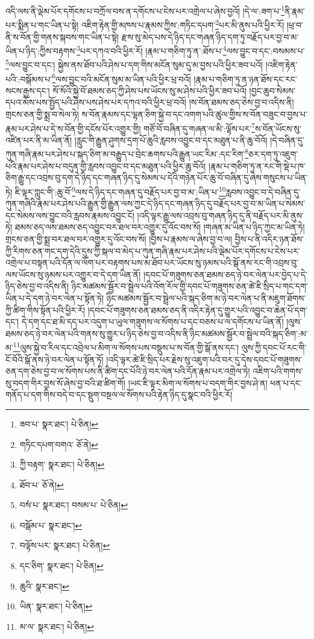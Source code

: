 འདི་ལས་ནི་ལྡེམ་པོར་དགོངས་པ་བཀྲོལ་བས་ན་དགོངས་པ་ངེས་པར་འགྲེལ་པ་ཞེས་བྱའོ། །དེ་ལ་:ཟག་པ་\footnote{ཟབ་པ་  སྣར་ཐང་།  པེ་ཅིན། }ནི་རྣམ་པར་སྨིན་པ་གང་ཡིན་པ་སྟེ། འཇིག་རྟེན་གྱི་མཁས་པ་རྣམས་ཀྱིས་:གཏིང་དཔག་\footnote{གཏིང་དཔག་བགའ་  ཅོ་ནེ། }པར་མི་ནུས་པའི་ཕྱིར་རོ། །ཕྲ་བ་ནི་ས་བོན་གྱི་གནས་སྐབས་གང་ཡིན་པ་སྟེ། རྫས་སུ་མེད་པས་དེ་ཉིད་དང་གཞན་ཉིད་དག་ཏུ་བརྗོད་པར་བྱ་བ་མ་ཡིན་པ་ཉིད་:ཀྱིས་བརྟགས་\footnote{ཀྱི་བརྟག་  སྣར་ཐང་།  པེ་ཅིན། }པར་དཀའ་བའི་ཕྱིར་རོ། །རྣམ་པ་གཅིག་ཏུ་ན་:ཐོས་པ་\footnote{ཐོབ་པ་  ཅོ་ནེ། }ལས་བྱུང་བ་དང་:བསམས་པ་\footnote{བསཾ་པ་  སྣར་ཐང་། བསམ་པ་  པེ་ཅིན། }ལས་བྱུང་བ་དང་། སྐྱེས་ནས་ཐོབ་པའི་ཤེས་པ་དག་གིས་མངོན་སུམ་དུ་མ་བྱས་པའི་ཕྱིར་ཟབ་པའོ། །འཇིག་རྟེན་པའི་:བསྒོམས་པ་\footnote{བསྒོམ་པ་  སྣར་ཐང་། }ལས་བྱུང་བའི་མངོན་སུམ་མ་ཡིན་པའི་ཕྱིར་ཕྲ་བའོ། །རྣམ་པ་གཅིག་ཏུ་ན་ཉན་ཐོས་དང་རང་སངས་རྒྱས་དང་། སོ་སོའི་སྐྱེ་བོ་ཐམས་ཅད་ཀྱི་ཤེས་པས་ཡོངས་སུ་མ་ཤེས་པའི་ཕྱིར་ཟབ་པའོ། །བྱང་ཆུབ་སེམས་དཔའ་མོས་པས་སྤྱོད་པའི་ཤེས་པས་ཤེས་པར་དཀའ་བའི་ཕྱིར་ཕྲ་བའོ། །ས་བོན་ཐམས་ཅད་ཅེས་བྱ་བ་འདིས་ནི། གྲངས་ཅན་གྱི་སྨྲ་བ་སེལ་ཏེ། ས་བོན་རྣམས་དང་ལྷན་ཅིག་སྐྱེ་བ་དང་འགག་པའི་ཚུལ་གྱིས་ས་བོན་བཟུང་བ་བྱས་པ་རྣམ་པར་ཤེས་པ་དེ་ས་བོན་གྱི་དངོས་པོར་འགྱུར་གྱི། གཙོ་བོ་བཞིན་དུ་གཞན་ལ་མི་:ལྟོས་པར་\footnote{བལྟོས་པར་  སྣར་ཐང་།  པེ་ཅིན། }ས་བོན་ཡོངས་སུ་འཛིན་པར་ནི་མ་ཡིན་ནོ། །རླུང་གི་རྒྱུན་ཤུགས་དྲག་པོ་ཆུའི་རླབས་འབྱུང་བ་དང་མཐུན་པ་ནི་ཆུ་བོའོ། །དེ་བཞིན་དུ་ཀུན་གཞི་རྣམ་པར་ཤེས་པ་སྐད་ཅིག་མ་བརྒྱུད་པ་བྲེང་ཆགས་པའི་རྒྱུན་ཡང་རིམ་:དང་རིག་\footnote{དང་ཅིག་  སྣར་ཐང་།  པེ་ཅིན། }ཅར་དག་ཏུ་འཇུག་པའི་རྣམ་པར་ཤེས་པ་བདུན་གྱི་རླབས་འབྱུང་བ་དང་མཐུན་པའི་ཕྱིར་ཆུ་བོའོ། །རྣམ་པ་གཅིག་ཏུ་ན་རང་གི་སྡེ་པ་ཁ་ཅིག་རྒྱུ་དང་འབྲས་བུ་དག་དེ་ཉིད་དང་གཞན་ཉིད་དུ་སེམས་པ་དེའི་གཉེན་པོར་ཆུ་བོ་བཞིན་དུ་ཞེས་གསུངས་པ་ཡིན་ཏེ། ཇི་ལྟར་ཀླུང་གི་:ཆུ་བོ་\footnote{ཆུའི་  སྣར་ཐང་། }ལས་དེ་ཉིད་དང་གཞན་དུ་བརྗོད་པར་བྱ་བ་མ་:ཡིན་པ་\footnote{ཡིན་  སྣར་ཐང་།  པེ་ཅིན། }རླབས་འབྱུང་བ་དེ་བཞིན་དུ་ཀུན་གཞིའི་རྣམ་པར་ཤེས་པའི་རྒྱུན་གྱི་རྒྱུན་ལས་ཀྱང་དེ་ཉིད་དང་གཞན་ཉིད་དུ་བརྗོད་པར་བྱ་བ་མ་ཡིན་པ་སེམས་དང་སེམས་ལས་བྱུང་བའི་རླབས་རྣམས་འབྱུང་ངོ། །འདི་ལྟར་རྒྱུ་ལས་འབྲས་བུ་གཞན་ཉིད་དུ་ནི་བརྗོད་པར་མི་ནུས་ཏེ། ཐམས་ཅད་ལས་ཐམས་ཅད་འབྱུང་བར་ཐལ་བར་འགྱུར་དུ་འོང་བས་སོ། །གཞན་མ་ཡིན་པ་ཉིད་ཀྱང་མ་ཡིན་ཏེ། གྲངས་ཅན་གྱི་སྨྲ་བར་ཐལ་བར་འགྱུར་དུ་འོང་བས་སོ། །བྱིས་པ་རྣམས་ལ་ཞེས་བྱ་བ་ལ། བྱིས་པ་ནི་འདིར་ཉན་ཐོས་ཀྱི་རིགས་ཅན་གང་དག་དེའི་དུས་ཀྱི་སྐལ་བ་མེད་པ་ཀུན་གཞི་རྣམ་པར་ཤེས་པའི་ལྡེམ་པོར་དགོངས་པ་ངེས་པར་འགྲེལ་པ་བསྟན་པའི་དོན་ལ་ལོག་པར་བརྟགས་པས་མ་ཐོབ་པར་ཡོངས་སུ་ཉམས་པའི་སྒོ་ནས་རང་གི་འབྲས་བུ་ལས་ཡོངས་སུ་ཉམས་པར་འགྱུར་བ་དེ་དག་ཡིན་ནོ། །དབང་པོ་གཟུགས་ཅན་ཐམས་ཅད་ཉེ་བར་ལེན་པར་བྱེད་པ་དེ་ཉིད་ཅེས་བྱ་བ་འདིས་ནི། ཉིང་མཚམས་སྦྱོར་བ་སྦྲེལ་པའི་འོག་རོལ་གྱི་དབང་པོ་གཟུགས་ཅན་ཚེ་ཇི་སྲིད་པ་གང་དག་ཡིན་པ་དེ་དག་ཉེ་བར་ལེན་པ་སྟོན་ཏེ། ཉིང་མཚམས་སྦྱོར་བ་སྦྲེལ་པའི་སྐད་ཅིག་མ་ཉེ་བར་ལེན་པ་ནི་མཇུག་ཐོགས་ཀྱི་ཚིག་གིས་སྟོན་པའི་ཕྱིར་རོ། །དབང་པོ་གཟུགས་ཅན་ཐམས་ཅད་ནི་འདིར་རྟེན་དུ་གྱུར་པའི་འབྱུང་བ་ཆེན་པོ་དག་དང་། དེ་དག་དང་ཐ་མི་དད་པར་འདུག་པ་ཡུལ་གཟུགས་ལ་སོགས་པ་དང་བཅས་པ་ལ་དགོངས་པ་ཡིན་ནོ། །ལུས་ཐམས་ཅད་ཉེ་བར་ལེན་པའི་གནས་སུ་གྱུར་པ་ཉིད་ཅེས་བྱ་བ་འདིས་ནི་ཉིང་མཚམས་སྦྱོར་བ་སྦྲེལ་བའི་སྐད་ཅིག་:མ་མ་\footnote{མ་ལ་  སྣར་ཐང་།  པེ་ཅིན། }ལུས་སྐྱེ་བ་རིལ་དང་འབྲེལ་པ་མིག་ལ་སོགས་པས་བསྡུས་པ་ས་བོན་གྱི་སྒོ་ནས་དང་། ལུས་ཀྱི་དབང་པོ་རང་གི་ངོ་བོའི་སྒོ་ནས་ཉེ་བར་ལེན་པ་སྟོན་ཏོ། །འདི་ལྟར་ཚེ་ཇི་སྲིད་པར་རྗེས་སུ་འཇུག་པའི་བར་དུ་དེས་དབང་པོ་གཟུགས་ཅན་དག་ཅེས་བྱ་བ་ལ་སོགས་པས་ནི་ཚིག་དང་པོའི་ཉེ་བར་ལེན་པའི་དོན་རྣམ་པར་འགྲེལ་ཏེ། འཇིག་པའི་གགས་སུ་བདག་གིར་བྱས་སོ་ཞེས་བྱ་བའི་ཐ་ཚིག་གོ། །ཡང་ཇི་ལྟར་མིག་ལ་སོགས་པ་བདག་གིར་བྱས་ཤེ་ན། ཕན་པ་དང་གནོད་པ་དག་གིས་བདེ་བ་དང་སྡུག་བསྔལ་ལ་སོགས་པའི་རྟེན་ཉིད་དུ་སྣང་བའི་ཕྱིར་རོ། 